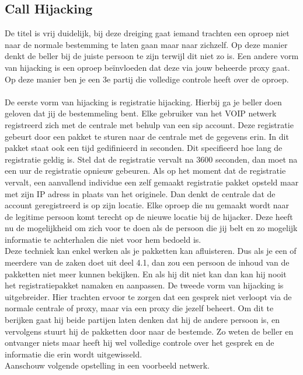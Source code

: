 \documentclass[pdftex,a4paper,12pt,twoside]{report}
\begin{document}
\subsection{Call Hijacking}
De titel is vrij duidelijk, bij deze dreiging gaat iemand trachten een oproep niet naar de normale bestemming te laten gaan maar naar zichzelf. Op deze manier denkt de beller bij de juiste persoon te zijn terwijl dit niet zo is. Een andere vorm van hijacking is een oproep beïnvloeden dat deze via jouw beheerde proxy gaat. Op deze manier ben je een 3e partij die volledige controle heeft over de oproep. 
\\ \\
De eerste vorm van hijacking is registratie hijacking. Hierbij ga je beller doen geloven dat jij de bestemmeling bent. Elke gebruiker van het VOIP netwerk registreerd zich met de centrale met behulp van een sip account. Deze registratie gebeurt door een pakket te sturen naar de centrale met de gegevens erin. In dit pakket staat ook een tijd gedifinieerd in seconden. Dit specifieerd hoe lang de registratie geldig is. Stel dat de registratie vervalt na 3600 seconden, dan moet na een uur de registratie opnieuw gebeuren. Als op het moment dat de registratie vervalt, een aanvallend individue een zelf gemaakt registratie pakket opsteld maar met zijn IP adress in plaats van het originele. Dan denkt de centrale dat de account geregistreerd is op zijn locatie. Elke oproep die nu gemaakt wordt naar de legitime persoon komt terecht op de nieuwe locatie bij de hijacker. Deze heeft nu de mogelijkheid om zich voor te doen als de persoon die jij belt en zo mogelijk informatie te achterhalen die niet voor hem bedoeld is.\\
Deze techniek kan enkel werken als je pakketten kan afluisteren. Dus als je een of meerdere van de zaken doet uit deel 4.1, dan zou een persoon de inhoud van de pakketten niet meer kunnen bekijken. En als hij dit niet kan dan kan hij nooit het registratiepakket namaken en aanpassen.
\newpage
De tweede vorm van hijacking is uitgebreider. Hier trachten ervoor te zorgen dat een gesprek niet verloopt via de normale centrale of proxy, maar via een proxy die jezelf beheert. Om dit te berijken gaat hij beide partijen laten denken dat hij de andere persoon is, en vervolgens stuurt hij de pakketten door naar de bestemde. Zo weten de beller en ontvanger niets maar heeft hij wel volledige controle over het gesprek en de informatie die erin wordt uitgewisseld.\\
Aanschouw volgende opstelling in een voorbeeld netwerk.
\end{document}
